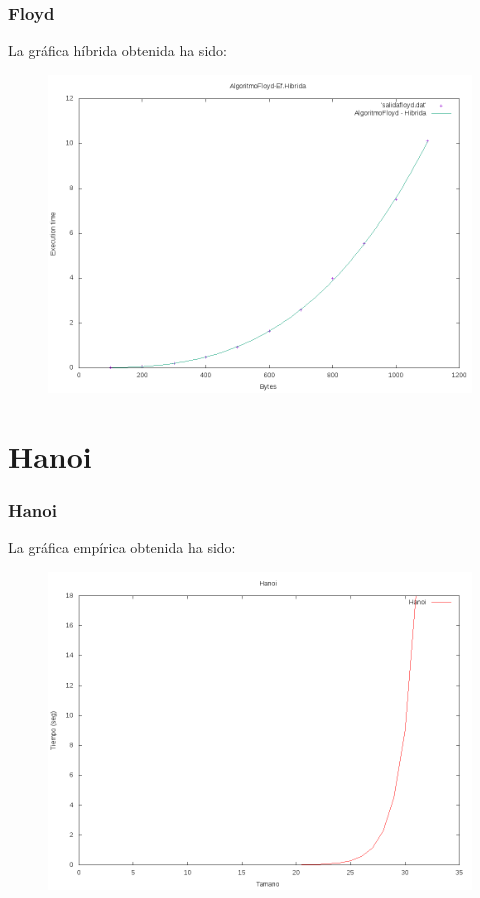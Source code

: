 \documentclass{beamer}
\begin{document}
\begin{frame}
	\frametitle{Floyd}
	La gráfica híbrida obtenida ha sido:
	\begin{figure}
		\centering
		\includegraphics[width=0.7\linewidth]{imagenes/algoritmoFloyd-hibrida.png}
		\caption{}
		\label{fig:E5}
	\end{figure}
\end{frame}
\section{Hanoi}
\begin{frame}
	\frametitle{Hanoi}
	La gráfica empírica obtenida ha sido:
	\begin{figure}
		\centering
		\includegraphics[width=0.7\linewidth]{imagenes/hanoiLines.png}
		\caption{}
		\label{fig:E4}
	\end{figure}
	
\end{frame}
\end{document}
